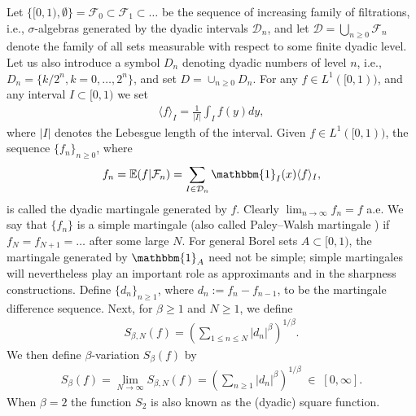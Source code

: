 \documentclass[11pt]{amsart}
\theoremstyle{definition}
\renewcommand{\1}{{\mathbbm{1}}}
\begin{document}
Let $\{{[0,1)}, \emptyset\} =\mathcal{F}_{0} \subset \mathcal{F}_{1} \subset \ldots$ be the sequence of increasing family of filtrations, i.e., $\sigma$-algebras generated by the dyadic intervals $\mathcal{D}_{n}$, and let $\mathcal{D} = \bigcup_{n\geq 0} \mathcal{F}_n$ denote the family of all sets measurable with respect to some finite dyadic level. Let us also introduce a symbol $D_{n}$ denoting dyadic numbers of level $n$, i.e., $D_{n} = \{ k/2^{n}, k=0, \ldots, 2^{n}\}$, and set $D= \cup_{n \geq 0} D_{n}$. For any $f \in {L^{1}([0,1))}$, and any interval $I \subset {[0,1)}$ we set
\begin{align*}
\langle f \rangle_{I} = \frac{1}{|I|} \int_{I} f(y)dy,
\end{align*}
where $|I|$ denotes the Lebesgue length of the interval. Given $f \in {L^{1}([0,1))}$, the sequence $\{f_{n}\}_{n \geq 0}$, where
\begin{align*}
f_{n} = \mathbb{E} (f|\mathcal{F}_{n}) = \sum_{I\in \mathcal{D}_n} \mathbbm{1}_{I}(x)\langle f \rangle_{I},
\end{align*}
is called the dyadic martingale generated by $f$. Clearly $\lim_{n \to \infty} f_{n} =f$ a.e. We say that $\{f_{n}\}$ is a simple martingale (also called Paley--Walsh martingale \cite{ABS}) if $f_{N}=f_{N+1}=\ldots$ after some large $N$. For general Borel sets $A\subset {[0,1)}$, the martingale generated by $\mathbbm{1}_{A}$ need not be simple; simple martingales will nevertheless play an important role as approximants and in the sharpness constructions. Define $\{d_{n}\}_{n \geq 1}$, where $d_{n} := f_{n}-f_{n-1}$, to be the martingale difference sequence. Next, for $\beta \geq 1$ and $N\ge1$, we define
\begin{align*}
S_{\beta,N}(f)=\left(\sum_{1\leq n \leq N} |d_{n}|^{\beta}\right)^{1/\beta}.
\end{align*}
We then define $\beta$-variation $S_{\beta}(f)$ by
\begin{align*}
S_{\beta}(f) = \lim_{N \to \infty} S_{\beta,N}(f)
= \left(\sum_{n \geq 1} |d_{n}|^{\beta}\right)^{1/\beta} \; \in \;  [0, \infty]. 
\end{align*}
When $\beta=2$ the function $S_{2}$ is also known as the (dyadic) square function. 

\end{document}
